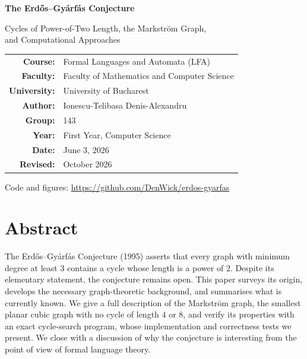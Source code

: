 \documentclass[11pt,a4paper]{article}
\theoremstyle{definition}
\begin{document}
\begin{titlepage}
  \centering
  \vspace*{3cm}
  {\Huge\bfseries The Erd\H{o}s--Gy\'arf\'as Conjecture\par}
  \vspace{0.8cm}
  {\Large Cycles of Power-of-Two Length, the Markstr\"om Graph,\\
   and Computational Approaches\par}
  \vspace{2.5cm}
  \begin{tabular}{rl}
    \textbf{Course:}     & Formal Languages and Automata (LFA) \\
    \textbf{Faculty:}    & Faculty of Mathematics and Computer Science \\
    \textbf{University:} & University of Bucharest \\[0.6em]
    \textbf{Author:}     & Ionescu-Telibasa Denis-Alexandru \\
    \textbf{Group:}      & 143 \\
    \textbf{Year:}       & First Year, Computer Science \\[0.6em]
    \textbf{Date:}       & June 3, 2026 \\
    \textbf{Revised:}    & October 2026
  \end{tabular}
  \vfill
  {\small Code and figures: \url{https://github.com/DenWick/erdos-gyarfas}\par}
\end{titlepage}

\tableofcontents
\newpage

\section*{Abstract}

The Erd\H{o}s--Gy\'arf\'as Conjecture (1995) asserts that every graph with
minimum degree at least $3$ contains a cycle whose length is a power of $2$.
Despite its elementary statement, the conjecture remains open. This paper
surveys its origin, develops the necessary graph-theoretic background, and
summarises what is currently known. We give a full description of the
Markstr\"om graph, the smallest planar cubic graph with no cycle of length $4$
or $8$, and verify its properties with an exact cycle-search program, whose
implementation and correctness tests we present. We close with a discussion of
why the conjecture is interesting from the point of view of formal language
theory.
\end{document}
